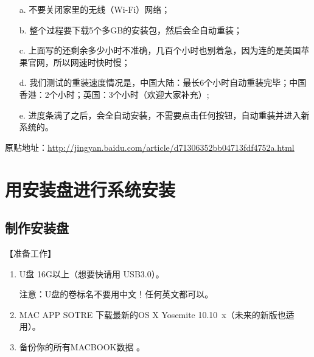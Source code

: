 \documentclass{article}
\begin{document}
\begin{enumerate}

\item[a.] 不要关闭家里的无线（Wi-Fi）网络；

\item[b.] 整个过程要下载5个多GB的安装包，然后会全自动重装；

\item[c.] 上面写的还剩余多少小时不准确，几百个小时也别着急，因为连的是美国苹果官网，所以网速时快时慢；

\item[d.] 我们测试的重装速度情况是，中国大陆：最长6个小时自动重装完毕；中国香港：2个小时；英国：3个小时（欢迎大家补充）;

\item[e.] 进度条满了之后，会全自动安装，不需要点击任何按钮，自动重装并进入新系统的。

\end{enumerate}

原贴地址：\url{http://jingyan.baidu.com/article/d71306352bb04713fdf4752a.html}

\section{用安装盘进行系统安装}
\subsection{制作安装盘}

【准备工作】
\begin{enumerate}
\item U盘 16G以上（想要快请用 USB3.0）。\par     
注意：U盘的卷标名不要用中文！任何英文都可以。
\item MAC APP SOTRE 下载最新的OS X Yosemite 10.10~x（未来的新版也适用）。
\item 备份你的所有MACBOOK数据 。 
\end{enumerate}
\end{document}
